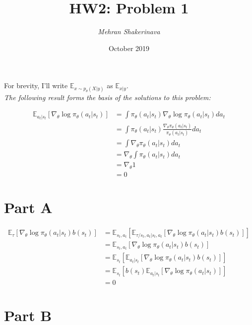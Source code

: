 \documentclass[10pt]{article}
\title{\huge\textbf{HW2: Problem 1}}
\author{\textit{Mehran Shakerinava}}
\date{October 2019}
\begin{document}
\maketitle

\noindent
For brevity, I'll write $\mathbb{E}_{x\sim p_\theta (X|y)}$ as $\mathbb{E}_{x|y}$.\\
\textit{The following result forms the basis of the solutions to this problem:}

\begin{equation*}
\begin{aligned}
\mathbb{E}_{a_t|s_t} \left[ \nabla_\theta \log \pi_\theta(a_t|s_t) \right] &= \int \pi_\theta(a_t|s_t) \nabla_\theta \log \pi_\theta(a_t|s_t) da_t \\
&= \int \pi_\theta(a_t|s_t) \frac {\nabla_\theta \pi_\theta(a_t|s_t)}{\pi_\theta(a_t|s_t)} da_t \\
&= \int \nabla_\theta \pi_\theta(a_t|s_t) da_t \\
&= \nabla_\theta \int \pi_\theta(a_t|s_t) da_t \\
&= \nabla_\theta 1 \\
&= 0
\end{aligned}
\end{equation*}


\section*{Part A}

\begin{equation*}
\begin{aligned}
\mathbb{E}_{\tau}\left[ \nabla_\theta \log \pi_\theta(a_t|s_t) b(s_t) \right] &= \mathbb{E}_{s_t, a_t} \left[ \mathbb{E}_{\tau/s_t, a_t|s_t, a_t} \left[ \nabla_\theta \log \pi_\theta(a_t|s_t) b(s_t) \right] \right] \\
&= \mathbb{E}_{s_t, a_t} \left[ \nabla_\theta \log \pi_\theta(a_t|s_t) b(s_t) \right] \\
&= \mathbb{E}_{s_t} \left[ \mathbb{E}_{a_t|s_t} \left[ \nabla_\theta \log \pi_\theta(a_t|s_t) b(s_t) \right] \right] \\
&= \mathbb{E}_{s_t} \left[ b(s_t) \mathbb{E}_{a_t|s_t} \left[ \nabla_\theta \log \pi_\theta(a_t|s_t) \right] \right] \\
&= 0
\end{aligned}
\end{equation*}


\section*{Part B}
\end{document}
